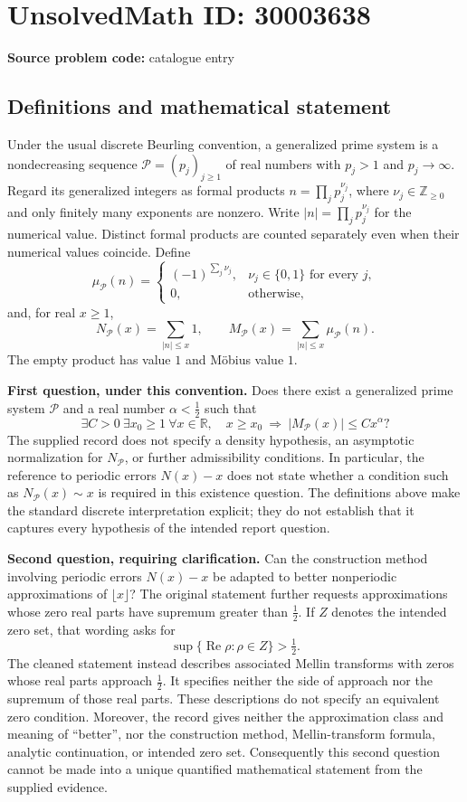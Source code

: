 \documentclass[11pt]{article}
\newcommand{\Z}{\mathbb{Z}}
\newcommand{\R}{\mathbb{R}}
\begin{document}
\section*{UnsolvedMath ID: 30003638}
\textbf{Source problem code:} catalogue entry
\subsection{Definitions and mathematical statement}
Under the usual discrete Beurling convention, a generalized prime system is a nondecreasing sequence \(\mathcal P=(p_j)_{j\geq 1}\) of real numbers with \(p_j>1\) and \(p_j\to\infty\). Regard its generalized integers as formal products \(n=\prod_j p_j^{\nu_j}\), where \(\nu_j\in\Z_{\geq0}\) and only finitely many exponents are nonzero. Write \(|n|=\prod_j p_j^{\nu_j}\) for the numerical value. Distinct formal products are counted separately even when their numerical values coincide. Define
\[
\mu_{\mathcal P}(n)=
\begin{cases}
(-1)^{\sum_j\nu_j},&\nu_j\in\{0,1\}\text{ for every }j,\\
0,&\text{otherwise},
\end{cases}
\]
and, for real \(x\geq1\),
\[
N_{\mathcal P}(x)=\sum_{|n|\leq x}1,
\qquad
M_{\mathcal P}(x)=\sum_{|n|\leq x}\mu_{\mathcal P}(n).
\]
The empty product has value \(1\) and Möbius value \(1\).

\textbf{First question, under this convention.} Does there exist a generalized prime system \(\mathcal P\) and a real number \(\alpha<\tfrac12\) such that
\[
\exists C>0\ \exists x_0\geq1\ \forall x\in\R,\quad
x\geq x_0\ \Longrightarrow\ |M_{\mathcal P}(x)|\leq Cx^\alpha?
\]
The supplied record does not specify a density hypothesis, an asymptotic normalization for \(N_{\mathcal P}\), or further admissibility conditions. In particular, the reference to periodic errors \(N(x)-x\) does not state whether a condition such as \(N_{\mathcal P}(x)\sim x\) is required in this existence question. The definitions above make the standard discrete interpretation explicit; they do not establish that it captures every hypothesis of the intended report question.

\textbf{Second question, requiring clarification.} Can the construction method involving periodic errors \(N(x)-x\) be adapted to better nonperiodic approximations of \(\lfloor x\rfloor\)? The original statement further requests approximations whose zero real parts have supremum greater than \(\tfrac12\). If \(Z\) denotes the intended zero set, that wording asks for
\[
\sup\{\operatorname{Re}\rho:\rho\in Z\}>\tfrac12.
\]
The cleaned statement instead describes associated Mellin transforms with zeros whose real parts approach \(\tfrac12\). It specifies neither the side of approach nor the supremum of those real parts. These descriptions do not specify an equivalent zero condition. Moreover, the record gives neither the approximation class and meaning of ``better'', nor the construction method, Mellin-transform formula, analytic continuation, or intended zero set. Consequently this second question cannot be made into a unique quantified mathematical statement from the supplied evidence.
\end{document}
